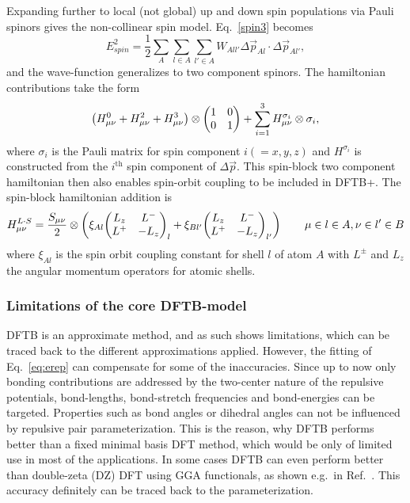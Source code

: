 \documentclass[reprint,onecolumn,superscriptaddress]{revtex4-1}
\newcommand{\dftbp}{DFTB+}
\begin{document}
Expanding further to local (not global) up and down spin populations via Pauli
spinors gives the non-collinear spin model.\cite{doi:10.1021/jp068802p}
Eq.~\eqref{spin3} becomes
\begin{equation}
E^2_{spin} = \frac{1}{2}\sum_{A}\sum_{l \in A} \sum_{l' \in A} W_{All'} \Delta \vec{p}_{Al} \cdot \Delta \vec{p}_{Al'},\label{spin3nc}
\end{equation}
and the wave-function generalizes to two component spinors. The hamiltonian
contributions take the form
\begin{equation}
\left(H^0_{\mu\nu} + H^2_{\mu\nu} + H^3_{\mu\nu}\right) \otimes \mqty(\pmat{0}) + \sum_{i=1}^{3} H^{\sigma_i}_{\mu\nu} \otimes \sigma_i, 
\end{equation}
where $\sigma_i$ is the Pauli matrix for spin component $i (= x,y,z)$ and
$H^{\sigma_i}$ is constructed from the $i^\mathrm{th}$ spin component of $\Delta
\vec{p}$. This spin-block two component hamiltonian then also enables spin-orbit
coupling\cite{doi:10.1021/jp068802p,Hourahine11} to be included in \dftbp{}. The
spin-block hamiltonian addition is
\begin{equation}
H_{\mu\nu}^{L \cdot S} = \frac{S_{\mu\nu}}{2} \otimes\left(  \xi_{Al} \mqty( L_z & L^-\\ L^+ & - L_z )_l + \xi_{Bl'} \mqty( L_z & L^-\\ L^+ & - L_z )_{l'} \right)\qquad{\mu \in l\in A, \nu \in l' \in B}
\end{equation}
where $\xi_{Al}$ is the spin orbit coupling constant for shell $l$ of atom $A$
with $L^\pm$ and $L_z$ the angular momentum operators for atomic shells.

\subsubsection{Limitations of the core DFTB-model}

DFTB is an approximate method, and as such shows limitations, which can be
traced back to the different approximations applied.  However, the fitting of
Eq.~\eqref{eq:erep} can compensate for some of the inaccuracies.  Since up to
now only bonding contributions are addressed by the two-center nature of the
repulsive potentials, bond-lengths, bond-stretch frequencies and bond-energies
can be targeted. Properties such as bond angles or dihedral angles can not be
influenced by repulsive pair parameterization.  This is the reason, why DFTB
performs better than a fixed minimal basis DFT method, which would be only of
limited use in most of the applications. In some cases DFTB can even perform
better than double-zeta (DZ) DFT using GGA functionals, as shown e.g.\ in
Ref.~\cite{Gaus2012}. This accuracy definitely can be traced back to the
parameterization.
\end{document}
